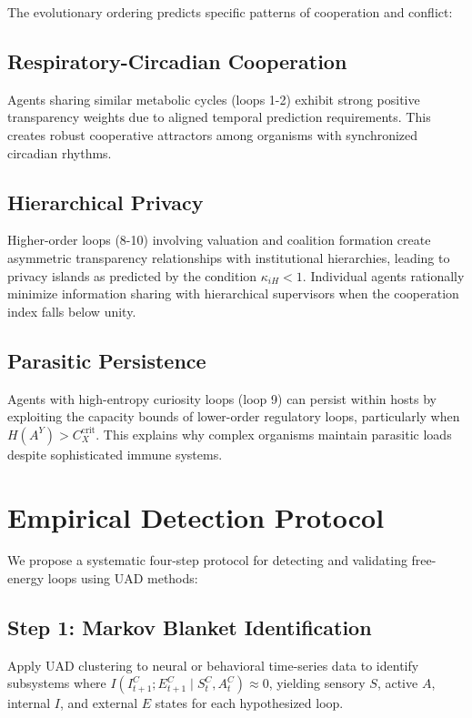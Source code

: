 \documentclass[10pt,conference]{IEEEtran}
\begin{document}
The evolutionary ordering predicts specific patterns of cooperation and conflict:

\subsection{Respiratory-Circadian Cooperation}
Agents sharing similar metabolic cycles (loops 1-2) exhibit strong positive transparency weights due to aligned temporal prediction requirements. This creates robust cooperative attractors among organisms with synchronized circadian rhythms.

\subsection{Hierarchical Privacy}
Higher-order loops (8-10) involving valuation and coalition formation create asymmetric transparency relationships with institutional hierarchies, leading to privacy islands as predicted by the condition $\kappa_{iH} < 1$. Individual agents rationally minimize information sharing with hierarchical supervisors when the cooperation index falls below unity.

\subsection{Parasitic Persistence}
Agents with high-entropy curiosity loops (loop 9) can persist within hosts by exploiting the capacity bounds of lower-order regulatory loops, particularly when $H(A^Y) > C_X^{\mathrm{crit}}$. This explains why complex organisms maintain parasitic loads despite sophisticated immune systems.

\section{Empirical Detection Protocol}

We propose a systematic four-step protocol for detecting and validating free-energy loops using UAD methods:

\subsection{Step 1: Markov Blanket Identification}
Apply UAD clustering to neural or behavioral time-series data to identify subsystems where $I(I^C_{t+1};E^C_{t+1}\mid S^C_t,A^C_t) \approx 0$, yielding sensory $S$, active $A$, internal $I$, and external $E$ states for each hypothesized loop.
\end{document}
